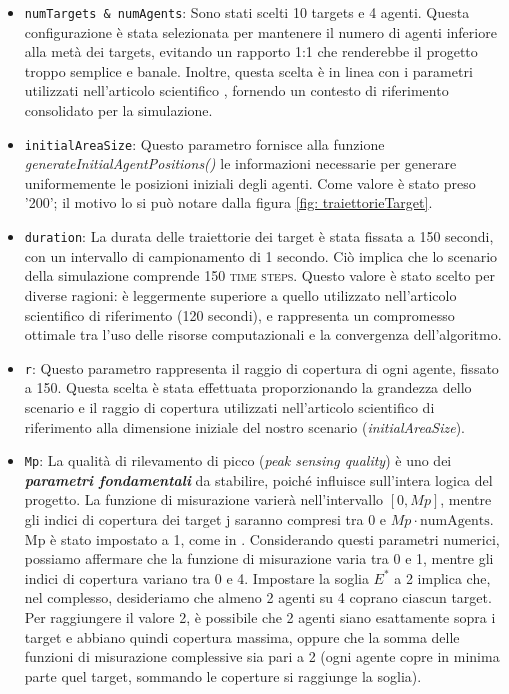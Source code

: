 \documentclass[twoside]{article}
\begin{document}
\begin{itemize}
    \item \verb|numTargets & numAgents|: Sono stati scelti 10 targets e 4 agenti. Questa configurazione è stata selezionata per mantenere il numero di agenti inferiore alla metà dei targets, evitando un rapporto 1:1 che renderebbe il progetto troppo semplice e banale. Inoltre, questa scelta è in linea con i parametri utilizzati nell'articolo scientifico \cite{Articolo_1}, fornendo un contesto di riferimento consolidato per la simulazione.
    
    \item \verb|initialAreaSize|: Questo parametro fornisce alla funzione \textit{generateInitialAgentPositions()} le informazioni necessarie per generare uniformemente le posizioni iniziali degli agenti. Come valore è stato preso '200'; il motivo lo si può notare dalla figura \ref{fig: traiettorieTarget}.
    
    \item \verb|duration|: La durata delle traiettorie dei target è stata fissata a 150 secondi, con un intervallo di campionamento di 1 secondo. Ciò implica che lo scenario della simulazione comprende 150 \textsc{time steps}. Questo valore è stato scelto per diverse ragioni: è leggermente superiore a quello utilizzato nell'articolo scientifico di riferimento (120 secondi), e rappresenta un compromesso ottimale tra l'uso delle risorse computazionali e la convergenza dell'algoritmo.
    
    \item \verb|r|: Questo parametro rappresenta il raggio di copertura di ogni agente, fissato a 150. Questa scelta è stata effettuata proporzionando la grandezza dello scenario e il raggio di copertura utilizzati nell'articolo scientifico di riferimento alla dimensione iniziale del nostro scenario (\textit{initialAreaSize}).
    
    \item \verb|Mp|: La qualità di rilevamento di picco (\textit{peak sensing quality}) è uno dei \textit{\textbf{parametri fondamentali}} da stabilire, poiché influisce sull'intera logica del progetto. La funzione di misurazione varierà nell'intervallo \ensuremath{[0, Mp]}, mentre gli indici di copertura dei target j saranno compresi tra 0 e \ensuremath{Mp \cdot \text{numAgents}}. Mp è stato impostato a 1, come in \cite{Articolo_1}. Considerando questi parametri numerici, possiamo affermare che la funzione di misurazione varia tra 0 e 1, mentre gli indici di copertura variano tra 0 e 4. Impostare la soglia \textit{$E^*$} a 2 implica che, nel complesso, desideriamo che almeno 2 agenti su 4 coprano ciascun target. Per raggiungere il valore 2, è possibile che 2 agenti siano esattamente sopra i target e abbiano quindi copertura massima, oppure che la somma delle funzioni di misurazione complessive sia pari a 2 (ogni agente copre in minima parte quel target, sommando le coperture si raggiunge la soglia).
    

\end{itemize}
\end{document}
